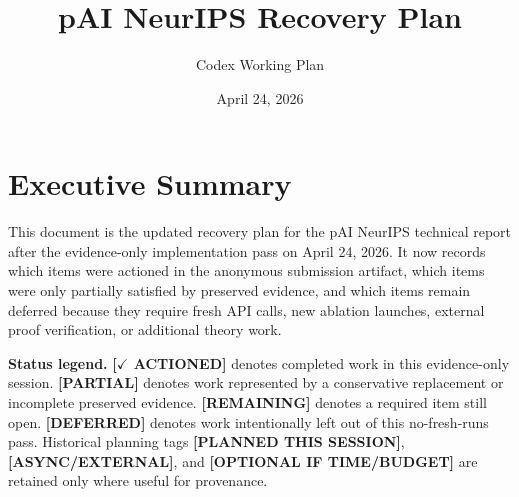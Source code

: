 \documentclass[11pt]{article}
\title{pAI NeurIPS Recovery Plan}
\author{Codex Working Plan}
\date{April 24, 2026}
\newcommand{\actioned}{\textbf{\textcolor{green!45!black}{[$\checkmark$ ACTIONED]}}}
\newcommand{\partialdone}{\textbf{\textcolor{orange!75!black}{[PARTIAL]}}}
\newcommand{\remaining}{\textbf{\textcolor{red!65!black}{[REMAINING]}}}
\newcommand{\deferred}{\textbf{\textcolor{blue!65!black}{[DEFERRED]}}}
\newcommand{\thissession}{\textbf{\textcolor{green!40!black}{[PLANNED THIS SESSION]}}}
\newcommand{\asyncexternal}{\textbf{\textcolor{orange!70!black}{[ASYNC/EXTERNAL]}}}
\newcommand{\optionalwork}{\textbf{\textcolor{blue!60!black}{[OPTIONAL IF TIME/BUDGET]}}}
\begin{document}
\maketitle

\section*{Executive Summary}
This document is the updated recovery plan for the pAI NeurIPS technical report after the evidence-only implementation pass on April 24, 2026. It now records which items were actioned in the anonymous submission artifact, which items were only partially satisfied by preserved evidence, and which items remain deferred because they require fresh API calls, new ablation launches, external proof verification, or additional theory work.

\textbf{Status legend.} \actioned{} denotes completed work in this evidence-only session. \partialdone{} denotes work represented by a conservative replacement or incomplete preserved evidence. \remaining{} denotes a required item still open. \deferred{} denotes work intentionally left out of this no-fresh-runs pass. Historical planning tags \thissession{}, \asyncexternal{}, and \optionalwork{} are retained only where useful for provenance.
\end{document}
